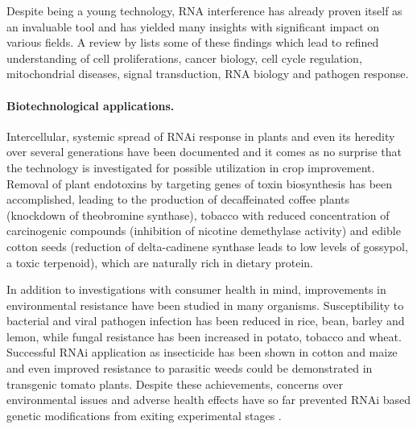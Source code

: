 Despite being a young technology, RNA interference has already proven itself as an invaluable tool and has yielded many insights with significant impact on various fields. A review by \cite{Mohr2010} lists some of these findings which lead to refined understanding of cell proliferations, cancer biology, cell cycle regulation, mitochondrial diseases, signal transduction, RNA biology and pathogen response. 

\paragraph{Biotechnological applications.}
Intercellular, systemic spread of RNAi response in plants and even its heredity over several generations have been documented and it comes as no surprise that the technology is investigated for possible utilization in crop improvement. Removal of plant endotoxins by targeting genes of toxin biosynthesis has been accomplished, leading to the production of decaffeinated coffee plants (knockdown of theobromine synthase), tobacco with reduced concentration of carcinogenic compounds (inhibition of nicotine demethylase activity) and edible cotton seeds (reduction of delta-cadinene synthase leads to low levels of gossypol, a toxic terpenoid), which are naturally rich in dietary protein.

In addition to investigations with consumer health in mind, improvements in environmental resistance have been studied in many organisms. Susceptibility to bacterial and viral pathogen infection has been reduced in rice, bean, barley and lemon, while fungal resistance has been increased in potato, tobacco and wheat. Successful RNAi application as insecticide has been shown in cotton and maize and even improved resistance to parasitic weeds could be demonstrated in transgenic tomato plants. Despite these achievements, concerns over environmental issues and adverse health effects have so far prevented RNAi based genetic modifications from exiting experimental stages \citep{Saurabh2014}.

